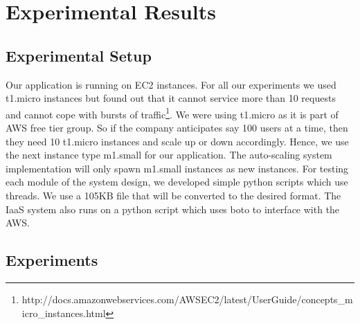 \section{Experimental Results}
\label{sec:exp}
\subsection{Experimental Setup}
Our application is running on EC2 instances. 
For all our experiments we used t1.micro instances but found out that it cannot service more than 10 requests and cannot cope with bursts of traffic\footnote{http://docs.amazonwebservices.com/AWSEC2/latest/UserGuide/concepts\_micro\_instances.html}. 
We were using t1.micro as it is part of AWS free tier group. 
So if the company anticipates say 100 users at a time, then they need 10 t1.micro instances and scale up or down accordingly.
Hence, we use the next instance type m1.small for our application. 
The auto-scaling system implementation will only  spawn m1.small instances as new instances. 
For testing each module of the system design, we developed simple python scripts which use threads. 
We use a 105KB file that will be converted to the desired format. 
The IaaS system also runs on a python script which uses boto to interface with the AWS.

\subsection{Experiments}